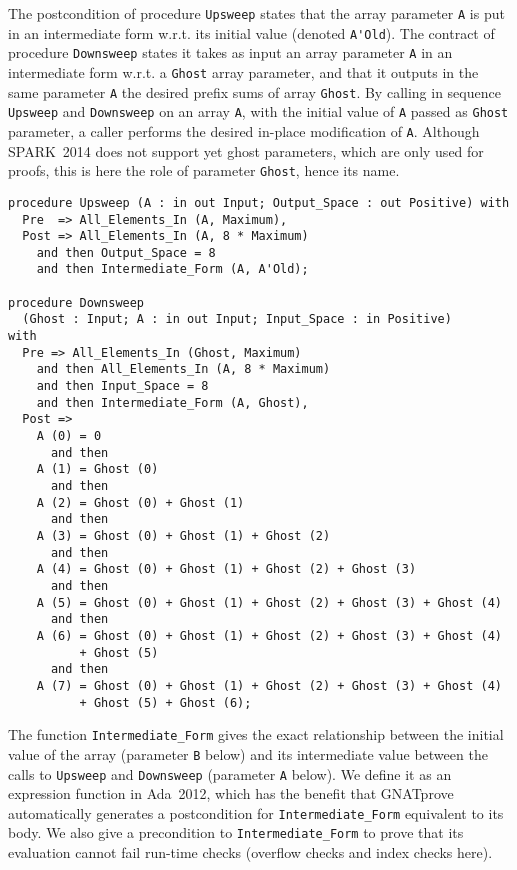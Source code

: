 \documentclass[sttt,draft]{svjour}
\newcommand{\gnatprove}{GNATprove\xspace}
\newcommand{\newspark}{SPARK~2014\xspace}
\newcommand{\adatwtw}{Ada~2012\xspace}
\newcommand{\wrt}{w.r.t.\xspace}
\begin{document}
The postcondition of procedure \verb|Upsweep| states that the array parameter
\verb|A| is put in an intermediate form \wrt its initial value (denoted
\verb|A'Old|). The contract of procedure \verb|Downsweep| states it takes as
input an array parameter \verb|A| in an intermediate form \wrt a \verb|Ghost|
array parameter, and that it outputs in the same parameter \verb|A| the desired
prefix sums of array \verb|Ghost|. By calling in sequence \verb|Upsweep| and
\verb|Downsweep| on an array \verb|A|, with the initial value of \verb|A|
passed as \verb|Ghost| parameter, a caller performs the desired in-place
modification of \verb|A|. Although \newspark does not support yet ghost
parameters, which are only used for proofs, this is here the role of parameter
\verb|Ghost|, hence its name.

\begin{footnotesize}
\begin{verbatim}
procedure Upsweep (A : in out Input; Output_Space : out Positive) with
  Pre  => All_Elements_In (A, Maximum),
  Post => All_Elements_In (A, 8 * Maximum)
    and then Output_Space = 8
    and then Intermediate_Form (A, A'Old);

procedure Downsweep
  (Ghost : Input; A : in out Input; Input_Space : in Positive)
with
  Pre => All_Elements_In (Ghost, Maximum)
    and then All_Elements_In (A, 8 * Maximum)
    and then Input_Space = 8
    and then Intermediate_Form (A, Ghost),
  Post =>
    A (0) = 0
      and then
    A (1) = Ghost (0)
      and then
    A (2) = Ghost (0) + Ghost (1)
      and then
    A (3) = Ghost (0) + Ghost (1) + Ghost (2)
      and then
    A (4) = Ghost (0) + Ghost (1) + Ghost (2) + Ghost (3)
      and then
    A (5) = Ghost (0) + Ghost (1) + Ghost (2) + Ghost (3) + Ghost (4)
      and then
    A (6) = Ghost (0) + Ghost (1) + Ghost (2) + Ghost (3) + Ghost (4)
          + Ghost (5)
      and then
    A (7) = Ghost (0) + Ghost (1) + Ghost (2) + Ghost (3) + Ghost (4)
          + Ghost (5) + Ghost (6);
\end{verbatim}
\end{footnotesize}

The function \verb|Intermediate_Form| gives the exact relationship between the
initial value of the array (parameter \verb|B| below) and its intermediate
value between the calls to \verb|Upsweep| and \verb|Downsweep| (parameter
\verb|A| below). We define it as an expression function in \adatwtw, which has
the benefit that \gnatprove automatically generates a postcondition for
\verb|Intermediate_Form| equivalent to its body. We also give a precondition to
\verb|Intermediate_Form| to prove that its evaluation cannot fail run-time
checks (overflow checks and index checks here).
\end{document}
